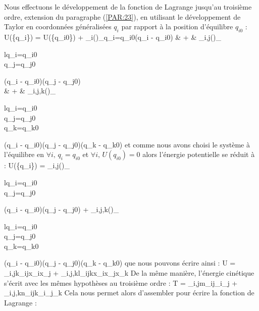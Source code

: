 Nous effectuons le d\'{e}veloppement de la fonction de Lagrange jusqu'au troisi\`{e}me ordre, extension du paragraphe (\ref{PAR:23}), en utilisant le d\'{e}veloppement de Taylor en coordonn\'{e}es g\'{e}n\'{e}ralis\'{e}es $q_{i}$ par rapport \`{a} la position d'\'{e}quilibre $q_{i0}$ :
\bea
	U(\left\{q_{i}\right\}) = U(\left\{q_{i0}\right\}) + \sum_{i}\left(\right)_{q_{i}=q_{i0}}(q_{i} - q_{i0}) & + & \sum_{i,j}\left(\right)_{\begin{subarray}{l}q_{i}=q_{i0}\\q_{j}=q_{j0}\end{subarray}}(q_{i} - q_{i0})(q_{j} - q_{j0}) \nonumber \\
	& + & \sum_{i,j,k}\left(\right)_{\begin{subarray}{l}q_{i}=q_{i0}\\q_{j}=q_{j0}\\q_{k}=q_{k0}\end{subarray}}(q_{i} - q_{i0})(q_{j} - q_{j0})(q_{k} - q_{k0}) \nonumber
\eea
et comme nous avons choisi le syst\`{e}me \`{a} l'\'{e}quilibre en $\forall i\text{, }q_{i} = q_{i0}$ et $\forall i\text{, }U(q_{i0}) = 0$ alors l'\'{e}nergie potentielle se r\'{e}duit \`{a} :
\benn
	U(\left\{q_{i}\right\}) = \sum_{i,j}\left(\right)_{\begin{subarray}{l}q_{i}=q_{i0}\\q_{j}=q_{j0}\end{subarray}}(q_{i} - q_{i0})(q_{j} - q_{j0}) + \sum_{i,j,k}\left(\right)_{\begin{subarray}{l}q_{i}=q_{i0}\\q_{j}=q_{j0}\\q_{k}=q_{k0}\end{subarray}}(q_{i} - q_{i0})(q_{j} - q_{j0})(q_{k} - q_{k0})
\eenn
que nous pouvons \'{e}crire ainsi :
\benn
	U = \sum_{i,j}k_{ij}x_{i}x_{j} + \sum_{i,j,k}l_{ijk}x_{i}x_{j}x_{k}
\eenn
De la m\^{e}me mani\`{e}re, l'\'{e}nergie cin\'{e}tique s'\'{e}crit avec les m\^{e}mes hypoth\`{e}ses au troisi\`{e}me ordre :
\benn
	T = \sum_{i,j}m_{ij}_{i}_{j} + \sum_{i,j,k}n_{ijk}_{i}_{j}_{k}
\eenn
Cela nous permet alors d'assembler pour \'{e}crire la fonction de Lagrange :
